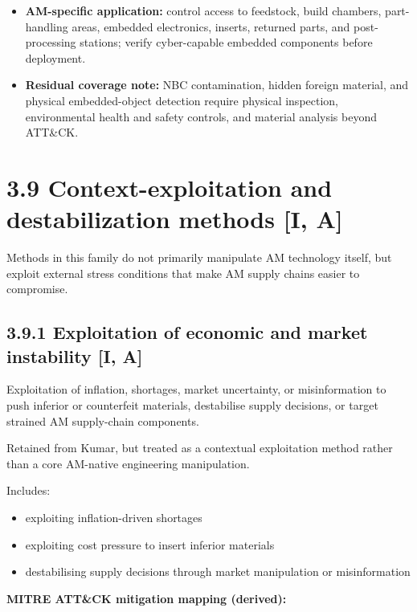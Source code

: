 \documentclass[10pt,a4paper,oneside]{report}
\begin{document}
\begin{itemize}
\item \textbf{AM-specific application:} control access to feedstock, build chambers, part-handling areas, embedded electronics, inserts, returned parts, and post-processing stations; verify cyber-capable embedded components before deployment.
\end{itemize}

\begin{itemize}
\item \textbf{Residual coverage note:} NBC contamination, hidden foreign material, and physical embedded-object detection require physical inspection, environmental health and safety controls, and material analysis beyond ATT\&CK.
\end{itemize}


\section{3.9 Context-exploitation and destabilization methods [I, A]}


Methods in this family do not primarily manipulate AM technology itself, but exploit external stress conditions that make AM supply chains easier to compromise.


\subsection{3.9.1 Exploitation of economic and market instability [I, A]}


Exploitation of inflation, shortages, market uncertainty, or misinformation to push inferior or counterfeit materials, destabilise supply decisions, or target strained AM supply-chain components.

Retained from Kumar, but treated as a contextual exploitation method rather than a core AM-native engineering manipulation.

Includes:

\begin{itemize}
\item exploiting inflation-driven shortages
\item exploiting cost pressure to insert inferior materials
\item destabilising supply decisions through market manipulation or misinformation
\end{itemize}

\textbf{MITRE ATT\&CK mitigation mapping (derived):}
\end{document}

